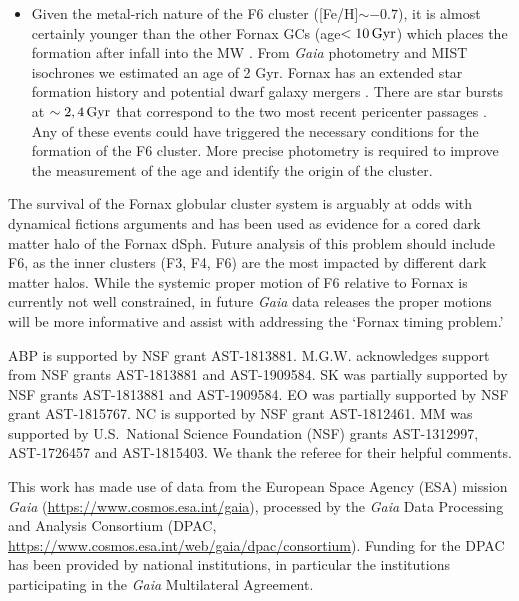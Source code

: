 \documentclass[twocolumn]{aastex63}
\begin{document}
\begin{itemize}
\item 
Given the metal-rich nature of the F6 cluster ([Fe/H]$\sim-0.7$), it is almost certainly younger than the other Fornax GCs (age$<10\mathrm{\,Gyr}$) which places the formation after infall into the MW \citep[$t_{if}\sim 10.7 \Gyr$;][]{Fillingham2019arXiv190604180F}.
From {\it Gaia} photometry and MIST isochrones we estimated an age of 2 Gyr.
Fornax has an extended star formation history \citep{Rusakov2021MNRAS.502..642R} and potential dwarf galaxy mergers \citep{Amorisco2012ApJ...756L...2A, delPino2017MNRAS.465.3708D}.  
There are star bursts at $\sim 2,4 \mathrm{\,Gyr}$ that correspond to the two most recent pericenter passages \citep{Rusakov2021MNRAS.502..642R, Fritz2018A&A...619A.103F}.  
Any of these events could have triggered the necessary conditions for the formation of the F6 cluster.  
More precise photometry is required to improve the measurement of the age and identify the origin of the cluster.
\end{itemize}



The survival of the Fornax globular cluster system is arguably at odds with dynamical fictions arguments and has been used as evidence for a cored dark matter halo of the Fornax dSph.
Future analysis of this problem should include F6, as the inner clusters (F3, F4, F6) are the most impacted by different dark matter halos. 
While the systemic proper motion of F6 relative to Fornax is currently not well constrained, in future {\it Gaia} data releases the proper motions will be more informative and assist with addressing the `Fornax timing problem.' 


\acknowledgments
ABP is supported by NSF grant AST-1813881.  M.G.W. acknowledges support from NSF grants AST-1813881 and AST-1909584. SK  was partially supported by NSF grants AST-1813881 and AST-1909584.
EO was partially supported by NSF grant AST-1815767.
NC is supported by NSF grant AST-1812461.
MM was supported by U.S.\ National Science Foundation (NSF) grants AST-1312997, AST-1726457 and AST-1815403.  
We thank the referee for their helpful comments. 

This work has made use of data from the European Space Agency (ESA)
mission {\it Gaia} (\url{https://www.cosmos.esa.int/gaia}), processed by the {\it Gaia} Data Processing and Analysis Consortium (DPAC,
\url{https://www.cosmos.esa.int/web/gaia/dpac/consortium}). Funding
for the DPAC has been provided by national institutions, in particular
the institutions participating in the {\it Gaia} Multilateral Agreement.
\end{document}
